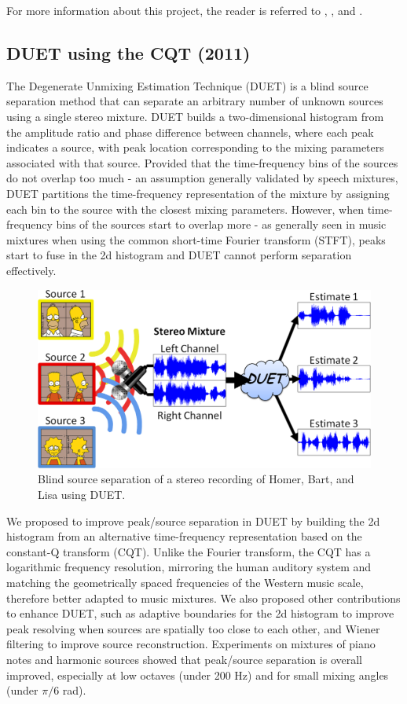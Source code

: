 \documentclass{article}
\begin{document}
For more information about this project, the reader is referred to \cite{article_sabin_jun2013}, \cite{inproceedings_rafii_oct2009}, and 
\cite{report_rafii_2009}.


\subsection{DUET using the CQT (2011)}
\label{ssec:duet}

The Degenerate Unmixing Estimation Technique (DUET) is a blind source separation method that can separate an arbitrary number of unknown sources using a single stereo mixture. DUET builds a two-dimensional histogram from the amplitude ratio and phase difference between channels, where each peak indicates a source, with peak location corresponding to the mixing parameters associated with that source. Provided that the time-frequency bins of the sources do not overlap too much - an assumption generally validated by speech mixtures, DUET partitions the time-frequency representation of the mixture by assigning each bin to the source with the closest mixing parameters. However, when time-frequency bins of the sources start to overlap more - as generally seen in music mixtures when using the common short-time Fourier transform (STFT), peaks start to fuse in the 2d histogram and DUET cannot perform separation effectively.

\begin{figure}[!htb]
\centering
\includegraphics[width=\columnwidth]{Images/duet.png}
\caption{Blind source separation of a stereo recording of Homer, Bart, and Lisa using DUET.}
\label{fig:duet}
\end{figure}

We proposed to improve peak/source separation in DUET by building the 2d histogram from an alternative time-frequency representation based on the constant-Q transform (CQT). Unlike the Fourier transform, the CQT has a logarithmic frequency resolution, mirroring the human auditory system and matching the geometrically spaced frequencies of the Western music scale, therefore better adapted to music mixtures. We also proposed other contributions to enhance DUET, such as adaptive boundaries for the 2d histogram to improve peak resolving when sources are spatially too close to each other, and Wiener filtering to improve source reconstruction. Experiments on mixtures of piano notes and harmonic sources showed that peak/source separation is overall improved, especially at low octaves (under 200 Hz) and for small mixing angles (under ${\pi}/{6}$ rad).
\end{document}

